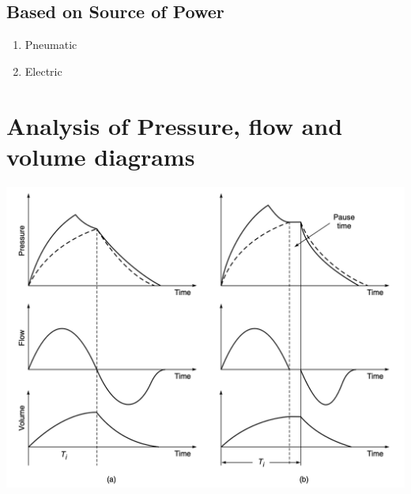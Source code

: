 \documentclass{article}
\begin{document}
\subsection{Based on Source of Power}
\begin{enumerate}
    \item Pneumatic 
    \item Electric
\end{enumerate}
\section{Analysis of Pressure, flow and volume diagrams}
\begin{center}
    \includegraphics[scale = 0.5]{Graphs.png}
\end{center}
\end{document}
